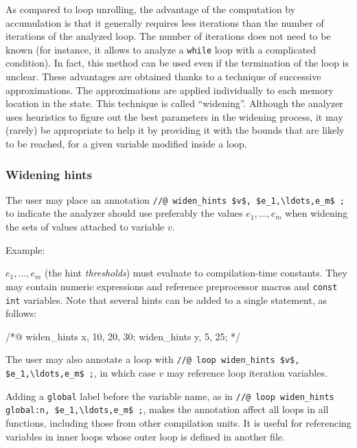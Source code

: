 \documentclass{frama-c-book}
\begin{document}
As compared to loop unrolling, the advantage of the computation
by accumulation is that it generally requires less iterations
than the number of iterations of the analyzed loop. The number of
iterations does not need to be known (for instance, it allows to
analyze a \lstinline|while| loop with a complicated condition).
In fact, this method can be used even if the termination of
the loop is unclear. These advantages are obtained thanks to
a technique of successive approximations. The approximations
are applied individually to each memory location in the state.
This technique is called ``widening''.
Although the analyzer uses heuristics to figure out the best
parameters in the widening process, it may (rarely) be appropriate
to help it by providing it with the bounds that are likely to
be reached, for a given variable modified inside a loop.

\subsubsection{Widening hints}
\label{subsub:widen-hints}

The user may place an annotation \lstinline|//@ widen_hints $v$, $e_1,\ldots,e_m$ ;|
to indicate the analyzer should use preferably the values $e_1,\ldots,e_m$
when widening the sets of values attached to variable $v$.

Example:

$e_1,\ldots,e_m$ (the hint \emph{thresholds}) must evaluate to compilation-time
constants. They may contain numeric expressions and reference preprocessor
macros and \lstinline|const int| variables.
Note that several hints can be added to a single statement, as follows:

\begin{listing-nonumber}
  /*@ widen_hints x, 10, 20, 30;
      widen_hints y, 5, 25; */
\end{listing-nonumber}

The user may also annotate a loop with
\lstinline|//@ loop widen_hints $v$, $e_1,\ldots,e_m$ ;|,
in which case $v$ may reference loop iteration variables.

Adding a \lstinline|global| label before the variable name, as in
\lstinline|//@ loop widen_hints global:n, $e_1,\ldots,e_m$ ;|,
makes the annotation affect all loops in all functions, including
those from other compilation units. It is useful for referencing variables
in inner loops whose outer loop is defined in another file.
\end{document}
